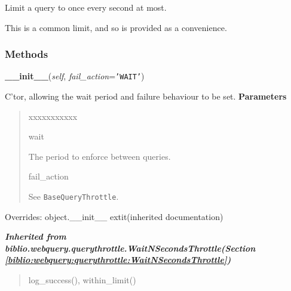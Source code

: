 Limit a query to once every second at most.

This is a common limit, and so is provided as a convenience.


  \subsubsection{Methods}

    \vspace{0.5ex}

\hspace{.8\funcindent}\begin{boxedminipage}{\funcwidth}

    \raggedright \textbf{\_\_init\_\_}(\textit{self}, \textit{fail\_action}={\tt \texttt{'}\texttt{WAIT}\texttt{'}})

\setlength{\parskip}{2ex}

C'tor, allowing the wait period and failure behaviour to be set.
\setlength{\parskip}{1ex}
      \textbf{Parameters}
      \vspace{-1ex}

      \begin{quote}
        \begin{Ventry}{xxxxxxxxxxx}

          \item[wait]


The period to enforce between queries.
          \item[fail\_action]


See \texttt{BaseQueryThrottle}.
        \end{Ventry}

      \end{quote}

      Overrides: object.\_\_init\_\_ 	extit{(inherited documentation)}

    \end{boxedminipage}


\large{\textbf{\textit{Inherited from biblio.webquery.querythrottle.WaitNSecondsThrottle\textit{(Section \ref{biblio:webquery:querythrottle:WaitNSecondsThrottle})}}}}

\begin{quote}
log\_success(), within\_limit()
\end{quote}


